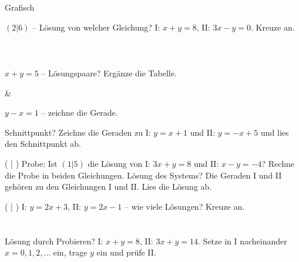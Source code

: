 \setcounter{aufgabe}{12}

\begin{aufgabe}{Grafisch}
\begin{teile}
\teil $(2|6)$ – Lösung von welcher Gleichung? I: $x + y = 8$, II: $3x - y = 0$. Kreuze an.\\ \\ \\ \\ 
\teil $x + y = 5$ – Lösungspaare? Ergänze die Tabelle.

\end{teile}
\begin{gleichungsraster}[2]
 &
\end{gleichungsraster}
\begin{teile}
\teil $y - x = 1$ – zeichne die Gerade.

\begin{ksys}[xmin=-5,xmax=5,ymin=-5,ymax=5] \end{ksys}
\teil Schnittpunkt? Zeichne die Geraden zu I: $y = x + 1$ und II: $y = -x + 5$ und lies den Schnittpunkt ab.

\begin{ksys}[xmin=-5,xmax=5,ymin=-5,ymax=5] \end{ksys}
( \leerfeld | \leerfeld )
\teil Probe: Ist $(1|5)$ die Lösung von I: $3x + y = 8$ und II: $x - y = -4$? Rechne die Probe in beiden Gleichungen. \janein
\teil Lösung des Systems? Die Geraden I und II gehören zu den Gleichungen I und II. Lies die Lösung ab.

\begin{ksys}[xmin=-5,xmax=5,ymin=-5,ymax=5,ablesen]   \end{ksys}
( \leerfeld | \leerfeld )
\teil I: $y = 2x + 3$, II: $y = 2x - 1$ – wie viele Lösungen? Kreuze an.\\ \\ \\ 
\teil Lösung durch Probieren? I: $x + y = 8$, II: $3x + y = 14$. Setze in I nacheinander $x = 0, 1, 2, \ldots$ ein, trage $y$ ein und prüfe II.


\end{teile}
\end{aufgabe}

